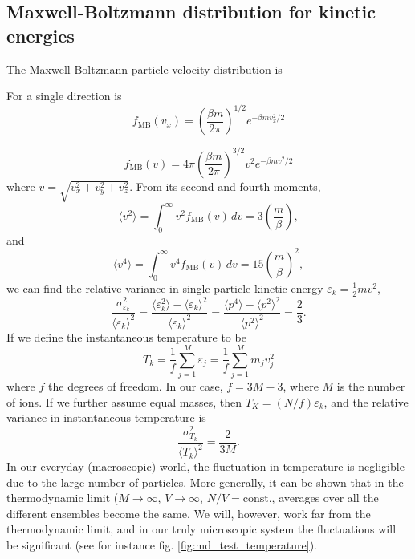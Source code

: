 \documentclass[11pt,bibliography=totoc,index=totoc]{scrbook}   %
\begin{document}
\subsection{Maxwell-Boltzmann distribution for kinetic energies}


The Maxwell-Boltzmann particle velocity distribution is

For a single direction is
\begin{equation}
  f_{\text{MB}}(v_x) = \left(\frac{\beta m}{2\pi }\right)^{1/2} e^{-\beta m v_x^2 / 2}
  \label{eq:maxboltz-vdist-1D}
\end{equation}

\begin{equation}
  f_{\text{MB}}(v) = 4\pi\left(\frac{\beta m}{2\pi }\right)^{3/2} v^2 e^{-\beta m v^2 / 2}
  \label{eq:maxboltz-vdist}
\end{equation}
where $v=\sqrt{v_x^2+v_y^2+v_z^2}$.
From its second and fourth moments,
\begin{equation}
  \langle v^2 \rangle = \int_0^{\infty} v^2 f_{\text{MB}}(v) \,dv = 3\left(\frac{m}{\beta}\right),
\end{equation}
and
\begin{equation}
  \langle v^4 \rangle = \int_0^{\infty} v^4 f_{\text{MB}}(v) \,dv = 15\left(\frac{m}{\beta}\right)^2,
\end{equation}
we can find the relative variance in single-particle kinetic energy $\varepsilon_k = \frac12 m v^2$,
\begin{equation}
  \frac{\sigma_{\varepsilon_k}^2}{\langle \varepsilon_k \rangle^2} 
  = \frac{\langle \varepsilon_k^2 \rangle - \langle \varepsilon_k \rangle^2}{ \langle \varepsilon_k \rangle^2 }
  = \frac{\langle p^4 \rangle - \langle p^2 \rangle^2}{ \langle p^2 \rangle^2 }
  = \frac{2}{3}.
\end{equation}
If we define the instantaneous temperature to be
\begin{equation}
  T_k = \frac{1}{f} \sum_{j=1}^M \varepsilon_j = \frac{1}{f}\sum_{j=1}^M m_j v_j^2
  \label{eq:kinetictemp}
\end{equation}
where $f$ the degrees of freedom.
In our case, $f=3M-3$, where $M$  is the number of ions.
If we further assume equal masses, then $T_K = (N/f) \varepsilon_k$, and the relative variance in instantaneous temperature is
\begin{equation}
  \frac{\sigma_{T_k}^2}{\langle T_k \rangle^2} = \frac{2}{3M}.
  \label{eq:tempvar}
\end{equation}
In our everyday (macroscopic) world, the fluctuation in temperature is negligible due to the large number of particles. 
More generally, it can be shown that in the thermodynamic limit ($M\to\infty$, $V\to\infty$, $N/V=\text{const.}$, 
averages over all the different ensembles become the same. We will, however, work far from the thermodynamic limit, 
and in our truly microscopic system the fluctuations will be significant (see for instance fig. \ref{fig:md_test_temperature}).
\end{document}
